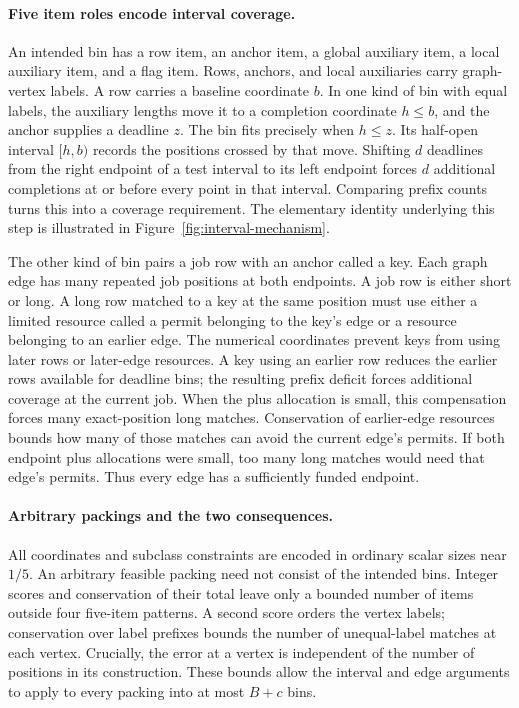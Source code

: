 \paragraph{Five item roles encode interval coverage.}
An intended bin has a row item, an anchor item, a global auxiliary item,
a local auxiliary item, and a flag item. Rows, anchors, and local
auxiliaries carry graph-vertex labels. A row carries a baseline
coordinate $b$. In one kind of bin with equal labels, the auxiliary
lengths move it to a completion coordinate $h\le b$, and the anchor
supplies a deadline $z$.
The bin fits precisely when $h\le z$. Its half-open interval $[h,b)$
records the positions crossed by that move. Shifting $d$ deadlines from
the right endpoint of a test interval to its left endpoint forces $d$
additional completions at or before every point in that interval. Comparing
prefix counts turns this into a coverage requirement. The elementary
identity underlying this step is illustrated in
Figure~\ref{fig:interval-mechanism}.



The other kind of bin pairs a job row with an anchor called a key.
Each graph edge has many repeated job positions at both endpoints.
A job row is either short or long. A long row matched to a key at
the same position must use either a limited resource called a permit
belonging to the key's edge or a resource belonging to an earlier edge.
The numerical coordinates prevent keys from using later rows or
later-edge resources. A key using an earlier row reduces the earlier
rows available for deadline bins; the resulting prefix deficit forces
additional coverage at the current job. When the plus allocation is
small, this compensation forces many exact-position long matches.
Conservation of earlier-edge resources bounds how many of those
matches can avoid the current edge's permits. If both endpoint plus
allocations were small, too many long matches would need that edge's
permits. Thus every edge has a sufficiently funded endpoint.

\paragraph{Arbitrary packings and the two consequences.}
All coordinates and subclass constraints are encoded in ordinary scalar
sizes near $1/5$. An arbitrary feasible packing need not consist of the
intended bins. Integer scores and conservation of their total leave only
a bounded number of items outside four five-item patterns. A second score
orders the vertex labels; conservation over label prefixes bounds the
number of unequal-label matches at each vertex. Crucially, the error at a
vertex is independent of the number of positions in its construction.
These bounds allow the interval and edge arguments to apply to every
packing into at most $B+c$ bins.

